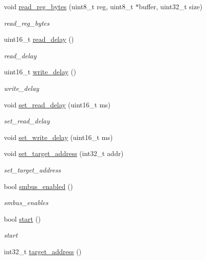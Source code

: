 \begin{DoxyCompactItemize}
void \hyperlink{classedi2c_acd7b0631883fca709e2d65d184c29826}{read\-\_\-reg\-\_\-bytes} (uint8\-\_\-t reg, uint8\-\_\-t $\ast$buffer, uint32\-\_\-t size)
\begin{DoxyCompactList}\small\item\em read\-\_\-reg\-\_\-bytes \end{DoxyCompactList}\item 
uint16\-\_\-t \hyperlink{classedi2c_a6e9e5641194e8cd076e6cedfc6673ed3}{read\-\_\-delay} ()
\begin{DoxyCompactList}\small\item\em read\-\_\-delay \end{DoxyCompactList}\item 
uint16\-\_\-t \hyperlink{classedi2c_ac72e569257fb740b0431d8ce5fa5a3d5}{write\-\_\-delay} ()
\begin{DoxyCompactList}\small\item\em write\-\_\-delay \end{DoxyCompactList}\item 
void \hyperlink{classedi2c_af56980b466616331c3a953f6b5c034ed}{set\-\_\-read\-\_\-delay} (uint16\-\_\-t ms)
\begin{DoxyCompactList}\small\item\em set\-\_\-read\-\_\-delay \end{DoxyCompactList}\item 
void \hyperlink{classedi2c_a2e9079f183b0f087b55398c55b38b97f}{set\-\_\-write\-\_\-delay} (uint16\-\_\-t ms)
\item 
void \hyperlink{classedi2c_a938ee09d908469548b31f6561d906528}{set\-\_\-target\-\_\-address} (int32\-\_\-t addr)
\begin{DoxyCompactList}\small\item\em set\-\_\-target\-\_\-address \end{DoxyCompactList}\item 
bool \hyperlink{classedi2c_a6888361fe70d4c9110113e4a45912f7c}{smbus\-\_\-enabled} ()
\begin{DoxyCompactList}\small\item\em smbus\-\_\-enables \end{DoxyCompactList}\item 
bool \hyperlink{classedi2c_ad0e06417e0b488df02b1864d316d72c1}{start} ()
\begin{DoxyCompactList}\small\item\em start \end{DoxyCompactList}\item 
int32\-\_\-t \hyperlink{classedi2c_aba709407bd42c5dcee257726dff12526}{target\-\_\-address} ()

\end{DoxyCompactItemize}
